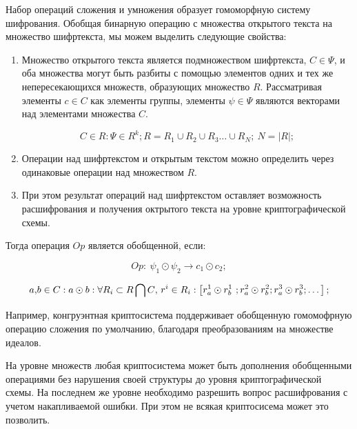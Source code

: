       Набор операций сложения и умножения образует гомоморфную систему шифрования. Обобщая бинарную операцию с множества открытого текста на множество шифртекста, мы можем выделить следующие свойства:

      \begin{enumerate}
            \item  Множество открытого текста является подмножеством шифртекста, $C\in \Psi $, и оба множества могут быть разбиты  с помощью элементов одних и тех же непересекающихся множеств, образующих множество $R$. Рассматривая элементы $c\in C$ как элементы группы, элементы $\psi \in \Psi $ являются векторами над элементами множества $C$. 

            \[C\in R:\Psi \in R^k;R=R_1\cup R_2\cup R_3\dots \cup R_N;~N=\left|R\right|;\] 

            \item \textit{ }Операции над шифртекстом и открытым текстом можно определить через одинаковые операции над множеством $R$.

            \item  При этом результат операций над шифртекстом оставляет возможность расшифрования и получения октрытого текста на уровне криптографической схемы.
      \end{enumerate}

      Тогда операция $Op$ является обобщенной, если:

            \[Op:~{\psi }_1\odot {\psi }_2\to c_1\odot c_2;\] 

            \[a \cmm b\in C:a\odot b:\forall R_i\subset R\bigcap C \cmm \ r^i\in R_i:\left[r^1_a\odot r^1_b\ ;r^2_a\odot r^2_b;r^3_a\odot r^3_b;\dots \right];\] 

\color{Gray} \tiny
      Например, конгруэнтная криптосистема поддерживает обобщенную гомомофрную операцию сложения по умолчанию, благодаря преобразованиям на множестве идеалов.
\normalcolor \normalsize

      На уровне множеств любая криптосистема может быть дополнения обобщенными операциями без нарушения своей структуры до уровня криптографической схемы. На последнем же уровне необходимо разрешить вопрос расшифрования с учетом накапливаемой ошибки. При этом не всякая криптосисема может это позволить.
